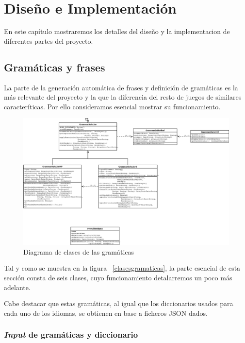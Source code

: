 \chapter{Diseño e Implementación}

En este capítulo mostraremos los detalles del diseño y la implementacion de diferentes partes del proyecto.

\section{Gramáticas y frases}

La parte de la generación automática de frases y definición de gramáticas es la más relevante del proyecto y la que la diferencia del resto de juegos de similares caracteríticas. Por ello consideramos esencial mostrar su funcionamiento.

\begin{figure}
    \includegraphics[width=\textwidth,height=\textheight,keepaspectratio,angle=90]{./img/grammarDiagram.png}
  \caption{Diagrama de clases de las gramáticas}
  \label{fig:clasesgramaticas}
\end{figure}

Tal y como se muestra en la figura ~\ref{clasesgramaticas}, la parte esencial de esta sección consta de seis clases, cuyo funcionamiento detalarremos un poco más adelante.

Cabe destacar que estas gramáticas, al igual que los diccionarios usados para cada uno de los idiomas, se obtienen en base a ficheros JSON dados.

\subsection{\textit{Input} de gramáticas y diccionario}

